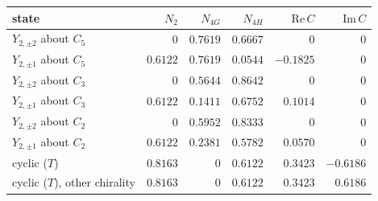 \begin{tabular}{lrrrrr}
\hline
state & $N_2$ & $N_{4G}$ & $N_{4H}$ & $\mathrm{Re}\,C$ & $\mathrm{Im}\,C$ \\
\hline
$Y_{2,\pm2}$ about $C_5$ & $0$ & $0.7619$ & $0.6667$ & $0$ & $0$ \\
$Y_{2,\pm1}$ about $C_5$ & $0.6122$ & $0.7619$ & $0.0544$ & $-0.1825$ & $0$ \\
$Y_{2,\pm2}$ about $C_3$ & $0$ & $0.5644$ & $0.8642$ & $0$ & $0$ \\
$Y_{2,\pm1}$ about $C_3$ & $0.6122$ & $0.1411$ & $0.6752$ & $0.1014$ & $0$ \\
$Y_{2,\pm2}$ about $C_2$ & $0$ & $0.5952$ & $0.8333$ & $0$ & $0$ \\
$Y_{2,\pm1}$ about $C_2$ & $0.6122$ & $0.2381$ & $0.5782$ & $0.0570$ & $0$ \\
cyclic ($T$) & $0.8163$ & $0$ & $0.6122$ & $0.3423$ & $-0.6186$ \\
cyclic ($T$), other chirality & $0.8163$ & $0$ & $0.6122$ & $0.3423$ & $0.6186$ \\
\hline
\end{tabular}

